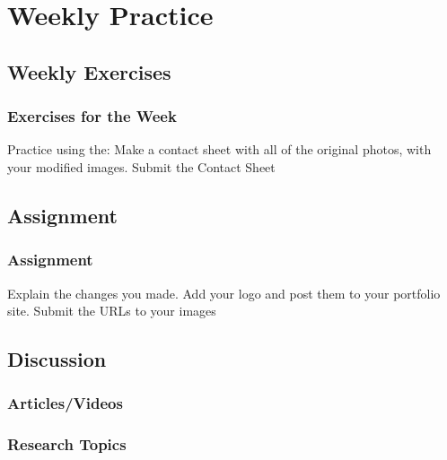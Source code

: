 \documentclass{beamer}
\begin{document}
			\subsection{}		
				\begin{frame}
					\frametitle{}
					\begin{outline}
						\1 
						\1 
						\1 
						\1 
						\1 
					\end{outline}
				\end{frame}


\section{Weekly Practice}

\subsection{Weekly Exercises}		
\begin{frame}
	\frametitle{Exercises for the Week}
	\begin{outline}
		\1 Practice using the:  
		\2 
		\2 
		\2 
		\2 
		\1 Make a contact sheet with all of the original photos, with your modified images.
		\1 Submit the Contact Sheet
	\end{outline}
\end{frame}

\subsection{Assignment}		
\begin{frame}
	\frametitle{ Assignment}
	\begin{outline}
		\1 
		\1 
		\2 Explain the changes you made.
		\2 Add your logo and post them to your portfolio site.
		\2 Submit the URLs to your images
	\end{outline}
\end{frame}

\subsection{Discussion}		
\begin{frame}
	\frametitle{Articles/Videos}
	\begin{outline}
		\1 
		\2 
		\2 
		\1 
		\2 
		\2  
		\1 
		\2 
		\2 
	\end{outline}
\end{frame}

\begin{frame}
	\frametitle{Research Topics}
	\begin{outline}
		\1 
		\1 
		\1 
		\1 
		\1 
		\1 
		\1 
		\1 
	\end{outline}
\end{frame}
	
			
\end{document}
